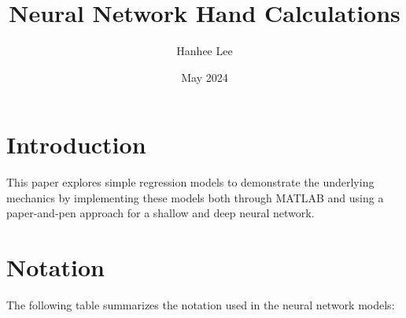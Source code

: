 \documentclass{article}
\title{Neural Network Hand Calculations}
\author{Hanhee Lee}
\date{May 2024}
\begin{document}
\maketitle

\section{Introduction}
This paper explores simple regression models to demonstrate the underlying mechanics by implementing these models both through MATLAB and using a paper-and-pen approach for a shallow and deep neural network.

\section{Notation}
The following table summarizes the notation used in the neural network models:

\end{document}
